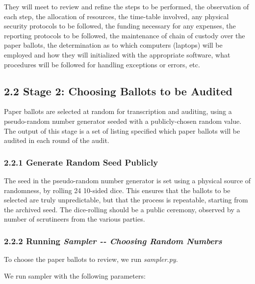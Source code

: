 \documentclass[]{article}
\begin{document}
They will meet to review and refine the steps to be performed, the
observation of each step, the allocation of resources, the time-table
involved, any physical security protocols to be followed, the funding
necessary for any expenses, the reporting protocols to be followed, the
maintenance of chain of custody over the paper ballots, the
determination as to which computers (laptops) will be employed and how
they will initialized with the appropriate software, what procedures
will be followed for handling exceptions or errors, etc.

\subsection{2.2 Stage 2: Choosing Ballots to be
Audited}\label{stage-2-choosing-ballots-to-be-audited}

Paper ballots are selected at random for transcription and auditing,
using a pseudo-random number generator seeded with a publicly-chosen
random value. The output of this stage is a set of listing specified
which paper ballots will be audited in each round of the audit.

\subsubsection{2.2.1 Generate Random Seed
Publicly}\label{generate-random-seed-publicly}

The seed in the pseudo-random number generator is set using a physical
source of randomness, by rolling 24 10-sided dice. This ensures that the
ballots to be selected are truly unpredictable, but that the process is
repeatable, starting from the archived seed. The dice-rolling should be
a public ceremony, observed by a number of scrutineers from the various
parties.

\subsubsection{\texorpdfstring{2.2.2 Running \emph{Sampler -\/- Choosing
Random
Numbers}}{2.2.2 Running Sampler -\/- Choosing Random Numbers}}\label{running-sampler----choosing-random-numbers}

To choose the paper ballots to review, we run \emph{sampler.py. }

We run sampler with the following parameters:
\end{document}
